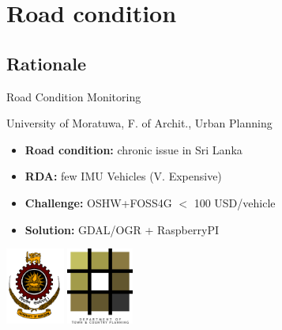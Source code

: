 \documentclass[xcolor=dvipsnames,beamer]{beamer} %
\begin{document}
\section{Road condition}
\subsection{Rationale}
\begin{frame}[fragile]{Road Condition Monitoring}

University of Moratuwa, F. of Archit., Urban Planning\\
\vspace{5mm}
\begin{itemize}
 \item {\bf Road condition:} chronic issue in Sri Lanka
 \item {\bf RDA:} few IMU Vehicles (V. Expensive)
 \item {\bf Challenge:} OSHW+FOSS4G $<$ 100 USD/vehicle 
 \item {\bf Solution:} GDAL/OGR + RaspberryPI
\end{itemize}
\vspace{5mm}
\begin{flushleft}
 \includegraphics[height=2.5cm]{uoMoratuwa}
 \hspace{5mm}
 \includegraphics[height=2.5cm]{uoMoratuwa_foa}
 \hspace{15mm}
\end{flushleft}
\end{frame}
\end{document}
